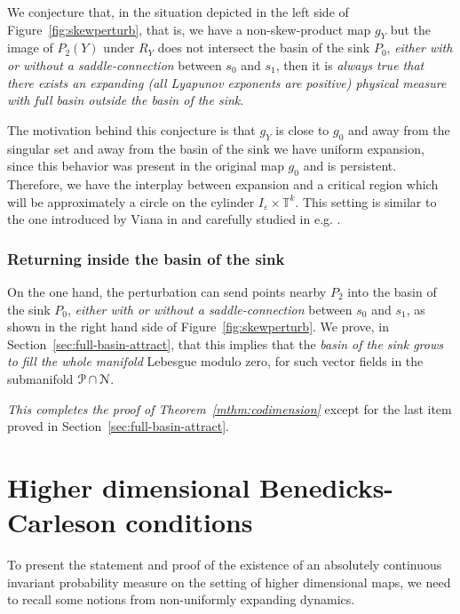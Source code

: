 \documentclass[reqno,12pt,a4paper]{amsart}
\theoremstyle{plain}
\theoremstyle{definition}
\begin{document}
We conjecture that, in the situation depicted in the left
side of Figure~\ref{fig:skewperturb}, that is, we have a
non-skew-product map $g_Y$ but the image of $P_2(Y)$ under
$R_Y$ does not intersect the basin of the sink $P_0$,
\emph{either with or without a saddle-connection} between
$s_0$ and $s_1$, then it is \emph{always true that there
  exists an expanding (all Lyapunov exponents are positive)
  physical measure with full basin outside the basin of the
  sink}.

The motivation behind this conjecture is that $g_Y$ is close
to $g_0$ and away from the singular set and away from the
basin of the sink we have uniform expansion, since this
behavior was present in the original map $g_0$ and is
persistent. Therefore, we have the interplay between
expansion and a critical region which will be approximately
a circle on the cylinder $I_{\varepsilon}\times {{\mathbb T}}^k$. This
setting is similar to the one introduced by Viana in
\cite[Theorem A]{Vi97} and carefully studied in
e.g. \cite{alves-viana2002,AA03,alves-luzzatto-pinheiro2005}.

\subsubsection{Returning inside the basin of the sink}
\label{sec:return-inside-basin}

On the one hand, the perturbation can send points nearby
$P_2$ into the basin of the sink $P_0$, \emph{either with or
  without a saddle-connection} between $s_0$ and $s_1$, as
shown in the right hand side of
Figure~\ref{fig:skewperturb}. We prove, in
Section~\ref{sec:full-basin-attract}, that this implies that
the \emph{basin of the sink grows to fill the whole
  manifold} Lebesgue modulo zero, for such vector fields in
the submanifold ${\EuScript{P}}\cap{\EuScript{N}}$.

\emph{This completes the proof of
  Theorem~\ref{mthm:codimension}} except for the last item
proved in Section~\ref{sec:full-basin-attract}.

\section{Higher dimensional Benedicks-Carleson conditions}
\label{sec:higher-dimens-misiur}

To present the statement and proof of the existence of an
absolutely continuous invariant probability measure on the
setting of higher dimensional maps, we need to recall some
notions from non-uniformly expanding dynamics.
\end{document}
